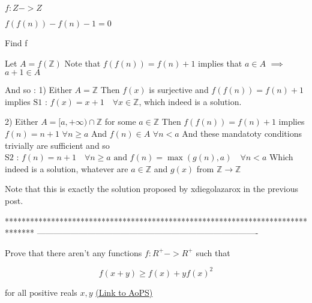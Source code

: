 \begin{solution}
	\begin{tcolorbox}$f:Z  -> Z $

$f(f(n)) - f(n) - 1 = 0$

\begin{bolded}\begin{italicized}Find f\end{italicized}\end{bolded}\end{tcolorbox}
Let $A=f(\mathbb Z)$
Note that $f(f(n))=f(n)+1$ implies that $a\in A$ $\implies$ $a+1\in A$

And so :
1) Either $A=\mathbb Z$
Then $f(x)$ is surjective and $f(f(n))=f(n)+1$ implies 
$\boxed{\text{S1 : }f(x)=x+1\quad\forall x\in\mathbb Z}$, which indeed is a solution.

2) Either $A=[a,+\infty)\cap \mathbb Z$ for some $a\in\mathbb Z$
Then $f(f(n))=f(n)+1$ implies $f(n)=n+1$ $\forall n\ge a$
And $f(n)\in A$ $\forall n<a$
And these mandatoty conditions trivially are sufficient and so
$\boxed{\text{S2 : }f(n)=n+1\quad\forall n\ge a\text{ and }f(n)=\max(g(n),a)\quad\forall n<a}$
Which indeed is a solution, whatever are $a\in\mathbb Z$ and $g(x)$ from $\mathbb Z\to\mathbb Z$

\begin{italicized}Note that this is exactly the solution proposed by xdiegolazarox in the previous post.\end{italicized}


\end{solution}
*******************************************************************************
-------------------------------------------------------------------------------

\begin{problem}
	Prove that there aren't any functions $f : R^{+} ->R^{+}$ such that

$$f(x+y) \geq f(x)+yf(x)^2$$

for all positive reals $x,y$ 
	\flushright \href{https://artofproblemsolving.com/community/c6h1579607}{(Link to AoPS)}
\end{problem}



